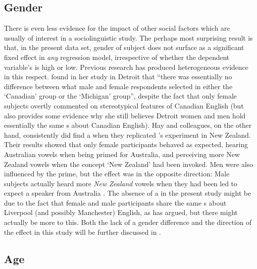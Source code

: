 		\subsection{Gender}
\largerpage
There is even less evidence for the impact of other social factors which are usually of interest in a sociolinguistic study.
The perhaps most surprising result is that, in the present data set, gender of subject does not surface as a significant fixed effect in \emph{any} regression model, irrespective of whether the dependent variable's  is high or low.
Previous research has produced heterogeneous evidence in this respect.
\textcite[69 and 79--80]{niedzielski1999} found in her study in Detroit that ``there was essentially no difference between what male and female respondents selected in either the `Canadian' group or the `Michigan' group'', despite the fact that only female subjects overtly commented on stereotypical features of Canadian English (but \citeauthor{niedzielski1999} also provides some evidence why she still believes Detroit women and men hold essentially the same s about Canadian English).
Hay and colleagues, on the other hand, consistently did find a  when they replicated \citeauthor{niedzielski1999}'s experiment in New Zealand.
Their results showed that only female participants behaved as expected, hearing Australian vowels when being primed for Australia, and perceiving more New Zealand vowels when the concept `New Zealand' had been invoked.
Men were also influenced by the prime, but the  effect was in the opposite direction: Male subjects actually heard more \emph{New Zealand} vowels when they had been led to expect a speaker from Australia \parencite{hayetal2006a,haydrager2010}.
The absence of a  in the present study might be due to the fact that female and male participants share the same s about Liverpool (and possibly Manchester) English, as \citeauthor{niedzielski1999} has argued, but there might actually be more to this.
Both the lack of a gender difference and the direction of the  effect in this study will be further discussed in .

		\subsection{Age}

